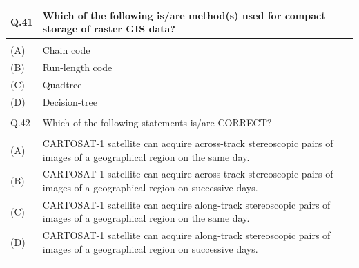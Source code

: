 \documentclass[12pt]{article}
\begin{document}
\begin{table}[H]
\renewcommand{\arraystretch}{3}
\setlength{\tabcolsep}{8pt}
\begin{tabular}{|l|p{15cm}|}
\hline
 
Q.41 & Which of the following is/are method(s) used for compact storage of raster GIS
data?\\ \hline 
 & \\ \hline
(A)&Chain code\\ \hline
(B)&Run-length code\\ \hline
(C)&Quadtree\\ \hline
(D)&Decision-tree\\ \hline
 & \\ \hline

Q.42& Which of the following statements is/are CORRECT?\\ \hline
 & \\ \hline
(A)&CARTOSAT-1 satellite can acquire across-track stereoscopic pairs of images of a
geographical region on the same day.\\ \hline
(B)&CARTOSAT-1 satellite can acquire across-track stereoscopic pairs of images of a
geographical region on successive days.\\ \hline
(C)&CARTOSAT-1 satellite can acquire along-track stereoscopic pairs of images of a
geographical region on the same day.\\ \hline
(D)&CARTOSAT-1 satellite can acquire along-track stereoscopic pairs of images of a
geographical region on successive days.\\ \hline
 
 & \\ \hline

 

\end{tabular}
\end{table}
\end{document}
